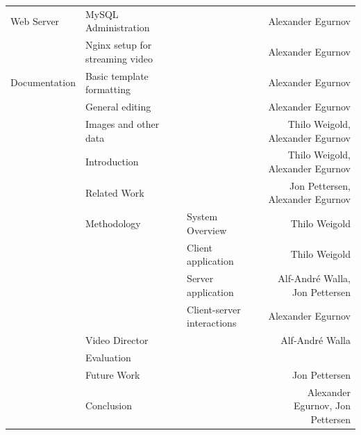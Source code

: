 \documentclass[conference]{IEEEtran}
\begin{document}
\begin{table}[t]
\begin{tabular}{lllr}
		\midrule
		Web Server
			& MySQL Administration & & Alexander Egurnov \\
			& Nginx setup for streaming video & & Alexander Egurnov \\
		\midrule
		Documentation 
			& Basic template formatting & & Alexander Egurnov \\
			& General editing & & Alexander Egurnov \\
			& Images and other data & & Thilo Weigold, Alexander Egurnov \\
			& Introduction & & Thilo Weigold, Alexander Egurnov \\
			& Related Work & & Jon Pettersen, Alexander Egurnov \\
			& Methodology & System Overview & Thilo Weigold \\
			&		& Client application & Thilo Weigold \\
			&		& Server application & Alf-André Walla, Jon Pettersen \\
			&		& Client-server interactions & Alexander Egurnov \\
			& Video Director & & Alf-André Walla \\
			& Evaluation & & \\
			& Future Work & & Jon Pettersen \\
			& Conclusion & & Alexander Egurnov, Jon Pettersen \\
		\bottomrule
    \end{tabular}%
\end{table}%

\vfill
\end{document}
